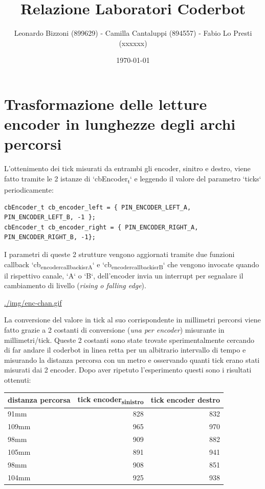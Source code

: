 \documentclass[11pt]{article}
\author{Leonardo Bizzoni (899629) - Camilla Cantaluppi (894557) - Fabio Lo Presti (xxxxxx)}
\date{\today}
\title{Relazione Laboratori Coderbot}
\begin{document}
\maketitle
\tableofcontents

\section{Trasformazione delle letture encoder in lunghezze degli archi percorsi}
\label{sec:org3a605c7}
L'ottenimento dei tick misurati da entrambi gli encoder, sinitro e destro, viene fatto tramite le 2 istanze di `cbEncoder\textsubscript{t}` e leggendo il valore del parametro `ticks` periodicamente:
\begin{verbatim}
cbEncoder_t cb_encoder_left = { PIN_ENCODER_LEFT_A, PIN_ENCODER_LEFT_B, -1 };
cbEncoder_t cb_encoder_right = { PIN_ENCODER_RIGHT_A, PIN_ENCODER_RIGHT_B, -1};
\end{verbatim}

I parametri di queste 2 strutture vengono aggiornati tramite due funzioni callback `cb\textsubscript{encoder}\textsubscript{callback}\textsubscript{isrA}` e `cb\textsubscript{encoder}\textsubscript{callback}\textsubscript{isrB}` che vengono invocate quando il rispettivo canale, `A` o `B`, dell'encoder invia un interrupt per segnalare il cambiamento di livello (\emph{rising o falling edge}).

\url{./img/enc-chan.gif}

La conversione del valore in tick al suo corrispondente in millimetri percorsi viene fatto grazie a 2 costanti di conversione (\emph{una per encoder}) misurante in millimetri/tick.
Queste 2 costanti sono state trovate sperimentalmente cercando di far andare il coderbot in linea retta per un albitrario intervallo di tempo e misurando la distanza percorsa con un metro e osservando quanti tick erano stati misurati dai 2 encoder. Dopo aver ripetuto l'esperimento questi sono i risultati ottenuti:
\begin{center}
\begin{tabular}{lrr}
distanza percorsa & tick encoder\textsubscript{sinistro} & tick encoder destro\\
\hline
91mm & 828 & 832\\
109mm & 965 & 970\\
98mm & 909 & 882\\
105mm & 891 & 941\\
98mm & 908 & 851\\
104mm & 925 & 938\\
\end{tabular}
\end{center}
\end{document}
